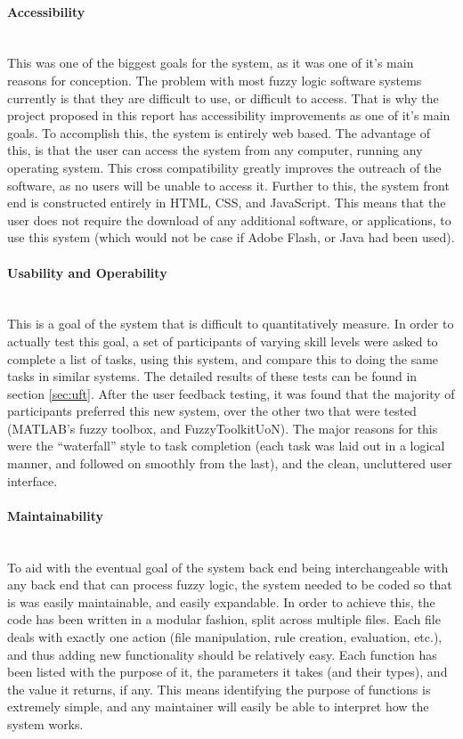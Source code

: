 \paragraph{Accessibility}\ \\
This was one of the biggest goals for the system, as it was one of it's main reasons for conception. The problem with most fuzzy logic software systems currently is that they are difficult to use, or difficult to access. That is why the project proposed in this report has accessibility improvements as one of it's main goals. To accomplish this, the system is entirely web based. The advantage of this, is that the user can access the system from any computer, running any operating system. This cross compatibility greatly improves the outreach of the software, as no users will be unable to access it. Further to this, the system front end is constructed entirely in HTML, CSS, and JavaScript. This means that the user does not require the download of any additional software, or applications, to use this system (which would not be case if Adobe Flash, or Java had been used). 

\paragraph{Usability and Operability}\ \\
This is a goal of the system that is difficult to quantitatively measure. In order to actually test this goal, a set of participants of varying skill levels were asked to complete a list of tasks, using this system, and compare this to doing the same tasks in similar systems. The detailed results of these tests can be found in section \ref{sec:uft}. After the user feedback testing, it was found that the majority of participants preferred this new system, over the other two that were tested (MATLAB's fuzzy toolbox, and FuzzyToolkitUoN). The major reasons for this were the ``waterfall'' style to task completion (each task was laid out in a logical manner, and followed on smoothly from the last), and the clean, uncluttered user interface. 

\newpage
\paragraph{Maintainability}\ \\
To aid with the eventual goal of the system back end being interchangeable with any back end that can process fuzzy logic, the system needed to be coded so that is was easily maintainable, and easily expandable. In order to achieve this, the code has been written in a modular fashion, split across multiple files. Each file deals with exactly one action (file manipulation, rule creation, evaluation, etc.), and thus adding new functionality should be relatively easy. Each function has been listed with the purpose of it, the parameters it takes (and their types), and the value it returns, if any. This means identifying the purpose of functions is extremely simple, and any maintainer will easily be able to interpret how the system works. 

